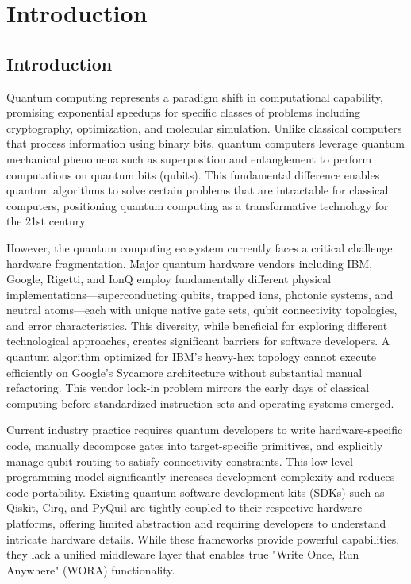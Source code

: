 
\chapter{Introduction}


\section{Introduction}

Quantum computing represents a paradigm shift in computational capability, promising exponential speedups for specific classes of problems including cryptography, optimization, and molecular simulation. Unlike classical computers that process information using binary bits, quantum computers leverage quantum mechanical phenomena such as superposition and entanglement to perform computations on quantum bits (qubits). This fundamental difference enables quantum algorithms to solve certain problems that are intractable for classical computers, positioning quantum computing as a transformative technology for the 21st century.

However, the quantum computing ecosystem currently faces a critical challenge: hardware fragmentation. Major quantum hardware vendors including IBM, Google, Rigetti, and IonQ employ fundamentally different physical implementations—superconducting qubits, trapped ions, photonic systems, and neutral atoms—each with unique native gate sets, qubit connectivity topologies, and error characteristics. This diversity, while beneficial for exploring different technological approaches, creates significant barriers for software developers. A quantum algorithm optimized for IBM's heavy-hex topology cannot execute efficiently on Google's Sycamore architecture without substantial manual refactoring. This vendor lock-in problem mirrors the early days of classical computing before standardized instruction sets and operating systems emerged.

Current industry practice requires quantum developers to write hardware-specific code, manually decompose gates into target-specific primitives, and explicitly manage qubit routing to satisfy connectivity constraints. This low-level programming model significantly increases development complexity and reduces code portability. Existing quantum software development kits (SDKs) such as Qiskit, Cirq, and PyQuil are tightly coupled to their respective hardware platforms, offering limited abstraction and requiring developers to understand intricate hardware details. While these frameworks provide powerful capabilities, they lack a unified middleware layer that enables true "Write Once, Run Anywhere" (WORA) functionality.

